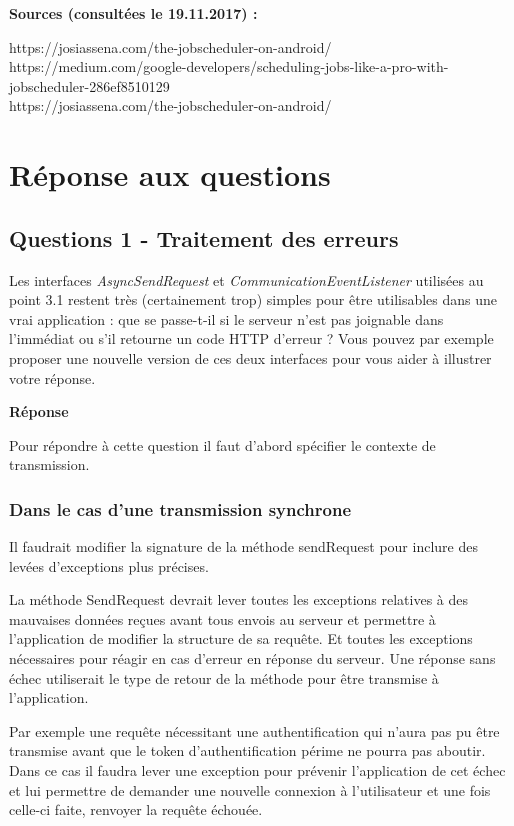 \documentclass[francais,12pt]{article}
\begin{document}
	\textbf{Sources (consultées le 19.11.2017) :}
	
	https://josiassena.com/the-jobscheduler-on-android/ \\
	https://medium.com/google-developers/scheduling-jobs-like-a-pro-with-jobscheduler-286ef8510129 \\
	https://josiassena.com/the-jobscheduler-on-android/ \\
	
	
	\section*{Réponse aux questions}
	
	\subsection*{Questions 1 - Traitement des erreurs}
	
	Les interfaces \textit{AsyncSendRequest} et \textit{CommunicationEventListener} utilisées au point 3.1 restent très (certainement trop) simples pour être utilisables dans une vrai application : que se passe-t-il si le serveur n'est pas joignable dans l'immédiat ou s'il retourne un code HTTP d'erreur ? Vous pouvez par exemple proposer une nouvelle version de ces deux interfaces pour vous aider à illustrer votre réponse.
	
	{\color[rgb]{0,0.5,0.23}\textbf{Réponse}}
	
	Pour répondre à cette question il faut d’abord spécifier le contexte de transmission.
	
	\subsubsection*{Dans le cas d’une transmission synchrone}
	Il faudrait modifier la signature de la méthode sendRequest pour inclure des levées d’exceptions plus précises. 
	
	La méthode SendRequest devrait lever toutes les exceptions relatives à des mauvaises données reçues avant tous envois au serveur et permettre à l’application de modifier la structure de sa requête. Et toutes les exceptions nécessaires pour réagir en cas d'erreur en réponse du serveur. Une réponse sans échec utiliserait le type de retour de la méthode pour être transmise à l'application. 
	
	Par exemple une requête nécessitant une authentification qui n’aura pas pu être transmise avant que le token d’authentification périme ne pourra pas aboutir. Dans ce cas il faudra lever une exception pour prévenir l’application de cet échec et lui permettre de demander une nouvelle connexion à l’utilisateur et une fois celle-ci faite, renvoyer la requête échouée.
	
\end{document}
